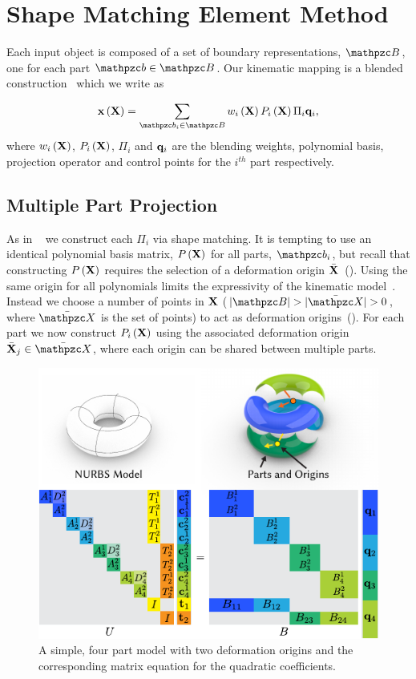 \section{Shape Matching Element Method}
 Each input object is composed of a set of boundary representations, $\Prts$, one for each part $\prt\in\Prts$. 
 Our kinematic mapping is a blended construction~\cite{10.1145/2614028.2615427,blendedFORKS2016} which we write as

 \begin{equation}
    \defX\left(\refX\right) = \sum_{\prt_i\in\Prts} \bldxi\Pmatxi\Pi_i\vc{q}_i, 
    \label{eq:kinematics}
 \end{equation} where $w_i\left(\mathbf{X}\right)$, $P_i\left(\mathbf{X} \right)$, $\Pi_i$ and $\mathbf{q}_i$ are the blending weights, polynomial basis, projection operator and control points for the $i^{th}$
 part respectively.  
 
 \subsection*{Multiple Part Projection}
As in ~ we construct each $\Pi_i$ via shape matching. 
It is tempting to use an identical polynomial basis matrix, $P\left(\mathbf{X}\right)$ for all parts, $\prt_i$, but recall that constructing $P\left(\mathbf{X}\right)$ requires the selection of a deformation
origin $\bar{\mathbf{X}}$~(). 
Using the same origin for all polynomials limits the expressivity of the kinematic model~\cite{STBS:2011}.
Instead we choose a number of points in $\mathbf{X}$ ($|\Prts| > |\XBs| > 0$, where $\XBs$ is the set of points)  to act as deformation origins~().
For each part we now construct $P_i\left(\mathbf{X} \right)$ using the associated deformation origin $\bar{\refX}_j\in \XBs$, where each origin can
be shared between multiple parts.

\begin{figure}[h]
    \includegraphics[width=\columnwidth]{figures/projection_operator_solve}
    \caption{A simple, four part model with two deformation origins and the corresponding matrix equation for the quadratic coefficients.}
    \label{fig:multiparts}
\end{figure}


